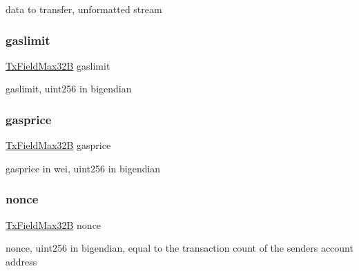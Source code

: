 data to transfer, unformatted stream 

\mbox{\label{struct_t_rawtx_fields_a95792a919f98aadb60695a2b6b900b41}} 
\subsubsection{\texorpdfstring{gaslimit}{gaslimit}}
{\footnotesize\ttfamily \mbox{\hyperlink{boattypes_8h_af8a3635bb5261915dff042bd32f3466b}{Tx\+Field\+Max32B}} gaslimit}



gaslimit, uint256 in bigendian 

\mbox{\label{struct_t_rawtx_fields_aa1618d84e9c13b48f6724f547039f6e2}} 
\subsubsection{\texorpdfstring{gasprice}{gasprice}}
{\footnotesize\ttfamily \mbox{\hyperlink{boattypes_8h_af8a3635bb5261915dff042bd32f3466b}{Tx\+Field\+Max32B}} gasprice}



gasprice in wei, uint256 in bigendian 

\mbox{\label{struct_t_rawtx_fields_ad1d39f55c87a8c8c7ffa505466e4e5b7}} 
\subsubsection{\texorpdfstring{nonce}{nonce}}
{\footnotesize\ttfamily \mbox{\hyperlink{boattypes_8h_af8a3635bb5261915dff042bd32f3466b}{Tx\+Field\+Max32B}} nonce}



nonce, uint256 in bigendian, equal to the transaction count of the sender\textquotesingle{}s account address 

\mbox{\label{struct_t_rawtx_fields_ab59fdcc512bfe81db16707e037dbab5b}} 
